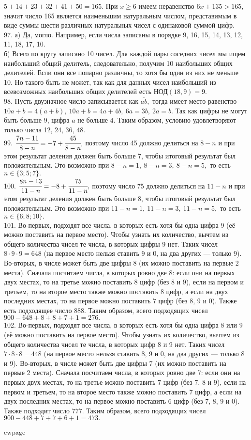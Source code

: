 $5+14+23+32+41+50=165.$ При $x\geqslant6$ имеем неравенство $6x+135>165,$ значит число 165 является наименьшим натуральным числом, представимым в виде суммы шести различных натуральных чисел с одинаковой суммой цифр.\\
97. а) Да, могло. Например, если числа записаны в порядке 9, 16, 15, 14, 13, 12, 11, 18, 17, 10.\\
б) Всего по кругу записано 10 чисел. Для каждой пары соседних чисел мы ищем наибольший общий делитель, следовательно, получим 10 наибольших общих делителей. Если они все попарно различны, то хотя бы один из них не меньше 10. Но такого быть не может, так как для данных чисел наибольший из всевозможных наибольших общих делителей есть НОД$(18,9) = 9.$\\
98. Пусть двузначное число записывается как $\overline{ab},$ тогда имеет место равенство $10a+b=4(a+b),\ 10a+b=4a+4b,\ 6a=3b,\ 2a=b.$ Так как цифры не могут быть больше 9, цифра $a$ не больше 4. Таким образом, условию удовлетворяют только числа 12, 24, 36, 48.\\
99. $\cfrac{7n-11}{8-n}=-7+\cfrac{45}{8-n},$ поэтому число 45 должно делиться на $8-n$ и при этом результат деления должен быть больше 7, чтобы итоговый результат был положительным. Это возможно при $8-n=1,\ 8-n=3,\ 8-n=5,$ то есть $n\in\{3;5;7\}.$\\
100. $\cfrac{8n-13}{11-n}=-8+\cfrac{75}{11-n},$ поэтому число 75 должно делиться на $11-n$ и при этом результат деления должен быть больше 8, чтобы итоговый результат был положительным. Это возможно при $11-n=1,\ 11-n=3,\ 11-n=5,$ то есть $n\in\{6;8;10\}.$\\
101. Во-первых, подходят все числа, в которых есть хотя бы одна цифра 9 (её можно поставить на первое место). Чтобы узнать их количество, вычтем из общего количества чисел те числа, в которых цифры 9 нет. Таких чисел $8\cdot9\cdot9=648$ (на первое место нельзя ставить 9 и 0, на два других --- только 9). Во-вторых, в числе может быть две цифры 8 (их можно поставить на первые 2 места). Сначала посчитаем числа, в которых ровно две 8: если они на первых двух местах, то на третье можно поставить 8 цифр (без 8 и 9), если на первом и третьем, то на второе место также можно поставить 8 цифр, а если на двух последних местах, то на первое можно поставить 7 цифр (без 8, 9 и 0). Также есть подходящее число 888.
Таким образом, всего подходящих чисел $900-648+8+8+7+1=276.$\\
102. Во-первых, подходят все числа, в которых есть хотя бы одна цифра 8 или 9 (её можно поставить на первое место). Чтобы узнать их количество, вычтем из общего количества чисел те числа, в которых цифр 8 и 9 нет. Таких чисел $7\cdot8\cdot8=448$ (на первое место нельзя ставить 8, 9 и 0, на два других --- только 8 и 9). Во-вторых, в числе может быть две цифры 7 (их можно поставить на первые 2 места). Сначала посчитаем числа, в которых ровно две 7: если они на первых двух местах, то на третье можно поставить 7 цифр (без 7, 8 и 9), если на первом и третьем, то на второе место также можно поставить 7 цифр, а если на двух последних местах, то на первое можно поставить 6 цифр (без 7, 8, 9 и 0). Также подходит число 777.
Таким образом, всего подходящих чисел $900-448+7+7+6+1=473.$

ewpage
